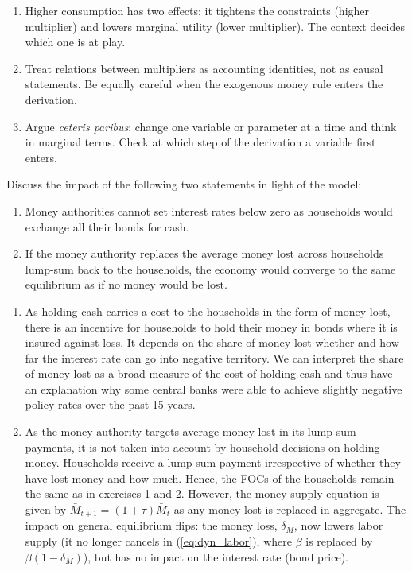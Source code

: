 \documentclass[a4paper, 12pt]{article}
\begin{document}
\begin{Answer}
\begin{enumerate}
		\item Higher consumption has two effects: it tightens the constraints (higher multiplier) and lowers marginal utility (lower multiplier). The context decides which one is at play.
		\item Treat relations between multipliers as accounting identities, not as causal statements. Be equally careful when the exogenous money rule enters the derivation.
		\item Argue \emph{ceteris paribus}: change one variable or parameter at a time and think in marginal terms. Check at which step of the derivation a variable first enters.
	\end{enumerate}%
\end{Answer}%
\bigskip%
\begin{Exercise}[title={Negative Interest Rates and Replacing Lost Money},label=ex_4]%
	Discuss the impact of the following two statements in light of the model:%
	\begin{enumerate}%
		\item Money authorities cannot set interest rates below zero as households would exchange all their bonds for cash.%
		\item If the money authority replaces the average money lost across households lump-sum back to the households, the economy would converge to the same equilibrium as if no money would be lost.%
	\end{enumerate}%
\end{Exercise}%
\bigskip%
\begin{Answer}%
	\begin{enumerate}%
		\item As holding cash carries a cost to the households in the form of money lost, there is an incentive for households to hold their money in bonds where it is insured against loss. It depends on the share of money lost whether and how far the interest rate can go into negative territory. We can interpret the share of money lost as a broad measure of the cost of holding cash and thus have an explanation why some central banks were able to achieve slightly negative policy rates over the past 15 years.%
		\item As the money authority targets average money lost in its lump-sum payments, it is not taken into account by household decisions on holding money. Households receive a lump-sum payment irrespective of whether they have lost money and how much. Hence, the FOCs of the households remain the same as in exercises 1 and 2. However, the money supply equation is given by $\bar{M}_{t+1} = \left(1+\tau\right) \bar{M}_t$ as any money lost is replaced in aggregate. The impact on general equilibrium flips: the money loss, $\delta_M$, now lowers labor supply (it no longer cancels in (\ref{eq:dyn_labor}), where $\beta$ is replaced by $\beta (1-\delta_M)$), but has no impact on the interest rate (bond price).%
	\end{enumerate}%
\end{Answer}%
\end{document}
